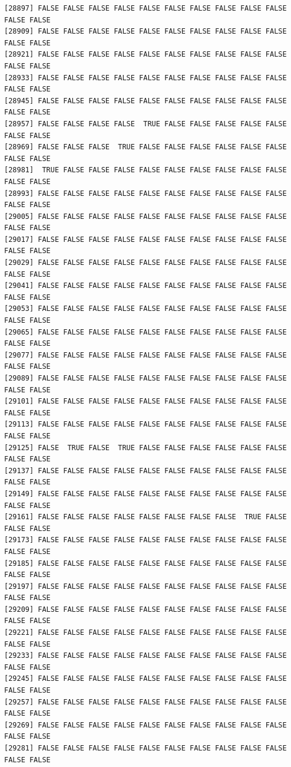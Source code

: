 \documentclass[
  a4paper,
  DIV=11,
  numbers=noendperiod]{scrartcl}
\begin{document}
\begin{verbatim}
[28897] FALSE FALSE FALSE FALSE FALSE FALSE FALSE FALSE FALSE FALSE FALSE FALSE
[28909] FALSE FALSE FALSE FALSE FALSE FALSE FALSE FALSE FALSE FALSE FALSE FALSE
[28921] FALSE FALSE FALSE FALSE FALSE FALSE FALSE FALSE FALSE FALSE FALSE FALSE
[28933] FALSE FALSE FALSE FALSE FALSE FALSE FALSE FALSE FALSE FALSE FALSE FALSE
[28945] FALSE FALSE FALSE FALSE FALSE FALSE FALSE FALSE FALSE FALSE FALSE FALSE
[28957] FALSE FALSE FALSE FALSE  TRUE FALSE FALSE FALSE FALSE FALSE FALSE FALSE
[28969] FALSE FALSE FALSE  TRUE FALSE FALSE FALSE FALSE FALSE FALSE FALSE FALSE
[28981]  TRUE FALSE FALSE FALSE FALSE FALSE FALSE FALSE FALSE FALSE FALSE FALSE
[28993] FALSE FALSE FALSE FALSE FALSE FALSE FALSE FALSE FALSE FALSE FALSE FALSE
[29005] FALSE FALSE FALSE FALSE FALSE FALSE FALSE FALSE FALSE FALSE FALSE FALSE
[29017] FALSE FALSE FALSE FALSE FALSE FALSE FALSE FALSE FALSE FALSE FALSE FALSE
[29029] FALSE FALSE FALSE FALSE FALSE FALSE FALSE FALSE FALSE FALSE FALSE FALSE
[29041] FALSE FALSE FALSE FALSE FALSE FALSE FALSE FALSE FALSE FALSE FALSE FALSE
[29053] FALSE FALSE FALSE FALSE FALSE FALSE FALSE FALSE FALSE FALSE FALSE FALSE
[29065] FALSE FALSE FALSE FALSE FALSE FALSE FALSE FALSE FALSE FALSE FALSE FALSE
[29077] FALSE FALSE FALSE FALSE FALSE FALSE FALSE FALSE FALSE FALSE FALSE FALSE
[29089] FALSE FALSE FALSE FALSE FALSE FALSE FALSE FALSE FALSE FALSE FALSE FALSE
[29101] FALSE FALSE FALSE FALSE FALSE FALSE FALSE FALSE FALSE FALSE FALSE FALSE
[29113] FALSE FALSE FALSE FALSE FALSE FALSE FALSE FALSE FALSE FALSE FALSE FALSE
[29125] FALSE  TRUE FALSE  TRUE FALSE FALSE FALSE FALSE FALSE FALSE FALSE FALSE
[29137] FALSE FALSE FALSE FALSE FALSE FALSE FALSE FALSE FALSE FALSE FALSE FALSE
[29149] FALSE FALSE FALSE FALSE FALSE FALSE FALSE FALSE FALSE FALSE FALSE FALSE
[29161] FALSE FALSE FALSE FALSE FALSE FALSE FALSE FALSE  TRUE FALSE FALSE FALSE
[29173] FALSE FALSE FALSE FALSE FALSE FALSE FALSE FALSE FALSE FALSE FALSE FALSE
[29185] FALSE FALSE FALSE FALSE FALSE FALSE FALSE FALSE FALSE FALSE FALSE FALSE
[29197] FALSE FALSE FALSE FALSE FALSE FALSE FALSE FALSE FALSE FALSE FALSE FALSE
[29209] FALSE FALSE FALSE FALSE FALSE FALSE FALSE FALSE FALSE FALSE FALSE FALSE
[29221] FALSE FALSE FALSE FALSE FALSE FALSE FALSE FALSE FALSE FALSE FALSE FALSE
[29233] FALSE FALSE FALSE FALSE FALSE FALSE FALSE FALSE FALSE FALSE FALSE FALSE
[29245] FALSE FALSE FALSE FALSE FALSE FALSE FALSE FALSE FALSE FALSE FALSE FALSE
[29257] FALSE FALSE FALSE FALSE FALSE FALSE FALSE FALSE FALSE FALSE FALSE FALSE
[29269] FALSE FALSE FALSE FALSE FALSE FALSE FALSE FALSE FALSE FALSE FALSE FALSE
[29281] FALSE FALSE FALSE FALSE FALSE FALSE FALSE FALSE FALSE FALSE FALSE FALSE

\end{verbatim}
\end{document}

